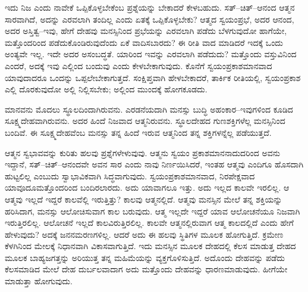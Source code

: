 \vskip 0.2cm

ಇದು ನಿಜ ಎಂದು ನಾವೇಕೆ ಒಪ್ಪಿಕೊಳ್ಳಬೇಕೆಂಬ ಪ್ರಶ್ನೆಯನ್ನು ಬೇಕಾದರೆ ಕೇಳಬಹುದು. ಸತ್​–ಚಿತ್​–ಆನಂದ ಆತ್ಮನ ಸಾರವಾಗಿದೆ, ಅದನ್ನು ಎರವಲಾಗಿ ತಂದಿಲ್ಲ ಎಂದು ಏತಕ್ಕೆ ಒಪ್ಪಿಕೊಳ್ಳಬೇಕು? ಆತ್ಮದ ಸ್ವಯಂಪ್ರಭೆ, ಅದರ ಆನಂದ, ಅದರ ಅಸ್ತಿತ್ವ–ಇವು, ಹೇಗೆ ದೇಹವು ಮನಸ್ಸಿನಿಂದ ಪ್ರಭೆಯನ್ನು ಎರವಲಾಗಿ ಪಡೆದು ಬೆಳಗುವುದೋ ಹಾಗೆಯೇ, ಮತ್ತೊಂದರಿಂದ ಪಡೆದುಕೊಂಡಿರುವುದೆಂದು ಏಕೆ ವಾದಿಸಬಾರದು? ಈ ರೀತಿ ವಾದ ಮಾಡಿದರೆ ಇದಕ್ಕೆ ಒಂದು ಅಂತ್ಯವೇ ಇಲ್ಲ. ಇದೇ ಅದರ ಅಸಂಬದ್ಧತೆ. ಯಾರಿಂದ ಇವನ್ನು ಎರವಲಾಗಿ ಪಡೆದುದು? ಮತ್ತೊಂದು ವಸ್ತುವಿನಿಂದ ಎಂದರೆ, ಅದಕ್ಕೆ ಇವು ಎಲ್ಲಿಂದ ಬಂದುವು ಎಂದು ಕೇಳಬೇಕಾಗುವುದು. ಕೊನೆಗೆ ಸ್ವಯಂಪ್ರಕಾಶಮಾನವಾದ ಯಾವುದಾದರೂ ಒಂದನ್ನು ಒಪ್ಪಲೇಬೇಕಾಗುತ್ತದೆ. ಸಂಕ್ಷಿಪ್ತವಾಗಿ ಹೇಳಬೇಕಾದರೆ, ತಾರ್ಕಿಕ ರೀತಿಯಲ್ಲಿ, ಸ್ವಯಂಪ್ರಕಾಶ ಎಲ್ಲಿ ದೊರಕುವುದೋ ಅಲ್ಲಿ ನಿಲ್ಲಿಸಬೇಕು; ಅಲ್ಲಿಂದ ಮುಂದಕ್ಕೆ ಹೋಗಕೂಡದು.

ಮಾನವನು ಮೊದಲು ಸ್ಥೂಲದಿಂದಾಗಿರುವನು. ಎರಡನೆಯದಾಗಿ ಮನಸ್ಸು ಬುದ್ಧಿ ಅಹಂಕಾರ–ಇವುಗಳಿಂದ ಕೂಡಿದ ಸೂಕ್ಷ್ಮದೇಹವಾಗಿರುವನು. ಅದರ ಹಿಂದೆ ನಿಜವಾದ ಆತ್ಮನಿರುವನು. ಸ್ಥೂಲದೇಹದ ಗುಣಶಕ್ತಿಗಳೆಲ್ಲ ಮನಸ್ಸಿನಿಂದ ಬಂದಿವೆ. ಈ ಸೂಕ್ಷ್ಮದೇಹವೆಂಬ ಮನಸ್ಸು ತನ್ನ ಹಿಂದೆ ಇರುವ ಆತ್ಮನಿಂದ ತನ್ನ ಶಕ್ತಿಗಳನ್ನೆಲ್ಲ ಪಡೆಯುತ್ತದೆ.

\vskip 0.2cm

ಆತ್ಮನ ಸ್ವಭಾವವನ್ನು ಕುರಿತು ಹಲವು ಪ್ರಶ್ನೆಗಳೇಳುವುವು. ಆತ್ಮನು ಸ್ವಯಂ ಪ್ರಕಾಶಮಾನನಾದುದರಿಂದ ಅವನು ಇದ್ದಾನೆ, ಸತ್​–ಚಿತ್​–ಆನಂದವೇ ಅವನ ಸಾರ ಎಂದು ನಾವು ನಿರ್ಣಯಿಸಿದರೆ, ಇಂತಹ ಆತ್ಮವು ಎಂದಿಗೂ ಹೊಸದಾಗಿ ಹುಟ್ಟಲಿಲ್ಲ ಎಂಬುದು ಸ್ವಾಭಾವಿಕವಾಗಿ ಸಿದ್ಧವಾಗುವುದು. ಸ್ವಯಂಪ್ರಕಾಶಮಾನವಾದ, ನಿರಪೇಕ್ಷವಾದ ಯಾವೂದೂ\break ಮತ್ತೊಂದರಿಂದ ಬಂದಿರಲಾರದು. ಅದು ಯಾವಾಗಲೂ ಇತ್ತು. ಅದು ಇಲ್ಲದ ಕಾಲವೇ ಇರಲಿಲ್ಲ. ಆ ಆತ್ಮವು ಇಲ್ಲದೆ ಇದ್ದರೆ ಕಾಲವೆಲ್ಲಿ ಇರುತ್ತಿತ್ತು? ಕಾಲವು ಆತ್ಮನಲ್ಲಿದೆ. ಆತ್ಮವು ಮನಸ್ಸಿನ ಮೇಲೆ ತನ್ನ ಶಕ್ತಿಯನ್ನು ಹರಿಸಿದಾಗ, ಮನಸ್ಸು ಆಲೋಚಿಸುವಾಗ ಕಾಲ ಬರುವುದು. ಆತ್ಮ ಇಲ್ಲದೇ ಇದ್ದರೆ ಯಾವ ಆಲೋಚನೆಯೂ ನಿಜವಾಗಿ ಇರುತ್ತಿರಲಿಲ್ಲ. ಆಲೋಚನೆ ಇಲ್ಲದೆ ಕಾಲವಿರುತ್ತಿರಲಿಲ್ಲ. ಕಾಲವೇ ಆತ್ಮನಲ್ಲಿರುವಾಗ ಆತ್ಮ ಕಾಲದಲ್ಲಿದೆ ಎಂದು ಹೇಗೆ ಹೇಳುವುದು? ಅದಕ್ಕೆ ಜನನಮರಣಗಳಿಲ್ಲ. ಆದರೆ ಅದು ಈ ಹಲವು ಸ್ಥಿತಿಗಳ ಮೂಲಕ ಹೋಗುತ್ತಿದೆ. ಕ್ರಮೇಣ ಕೆಳಗಿನಿಂದ ಮೇಲಕ್ಕೆ ನಿಧಾನವಾಗಿ ವಿಕಾಸವಾಗುತ್ತಿದೆ. ಇದು ಮನಸ್ಸಿನ ಮೂಲಕ ದೇಹದಲ್ಲಿ ಕೆಲಸ ಮಾಡುತ್ತ ದೇಹದ ಮೂಲಕ ಬಾಹ್ಯಜಗತ್ತನ್ನು ಅರಿಯುತ್ತ ತನ್ನ ಮಹಿಮೆಯನ್ನು ವ್ಯಕ್ತಗೊಳಿಸುತ್ತಿದೆ. ಅದೊಂದು ದೇಹವನ್ನು ಪಡೆದು ಕೆಲಸಮಾಡಿದ ಮೇಲೆ ದೇಹ ದುರ್ಬಲವಾದಾಗ ಅದು ಮತ್ತೊಂದು ದೇಹವನ್ನು ಧಾರಣಮಾಡುವುದು. ಹೀಗೆಯೇ ಮಾಡುತ್ತಾ ಹೋಗುವುದು.

\vskip 0.2cm

